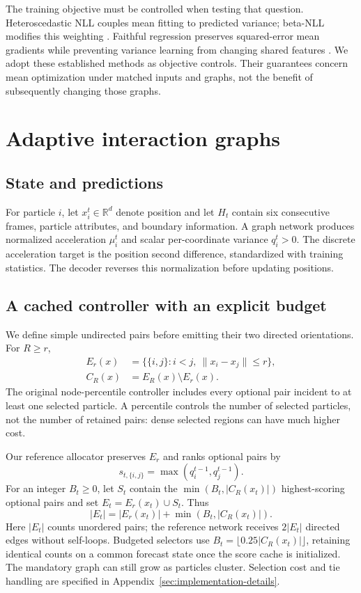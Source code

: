 The training objective must be controlled when testing that question. Heteroscedastic NLL couples mean fitting to predicted variance; beta-NLL modifies this weighting \citep{seitzer2022}. Faithful regression preserves squared-error mean gradients while preventing variance learning from changing shared features \citep{stirn2023}. We adopt these established methods as objective controls. Their guarantees concern mean optimization under matched inputs and graphs, not the benefit of subsequently changing those graphs.

\section{Adaptive interaction graphs}
\subsection{State and predictions}
For particle $i$, let $x_i^t\in\mathbb R^d$ denote position and let $H_t$ contain six consecutive frames, particle attributes, and boundary information. A graph network produces normalized acceleration $\mu_i^t$ and scalar per-coordinate variance $q_i^t>0$. The discrete acceleration target is the position second difference, standardized with training statistics. The decoder reverses this normalization before updating positions.

\subsection{A cached controller with an explicit budget}
We define simple undirected pairs before emitting their two directed orientations. For $R\ge r$,
\begin{align}
 E_r(x)&=\{\{i,j\}:i<j,\ \|x_i-x_j\|\le r\},\nonumber\\
 C_R(x)&=E_R(x)\setminus E_r(x).
\end{align}
The original node-percentile controller includes every optional pair incident to at least one selected particle. A percentile controls the number of selected particles, not the number of retained pairs: dense selected regions can have much higher cost.

Our reference allocator preserves $E_r$ and ranks optional pairs by
\begin{equation}
 s_{t,\{i,j\}}=\max(q_i^{t-1},q_j^{t-1}).
\end{equation}
For an integer $B_t\ge0$, let $S_t$ contain the $\min(B_t,|C_R(x_t)|)$ highest-scoring optional pairs and set $E_t=E_r(x_t)\cup S_t$. Thus
\begin{equation}
 |E_t|=|E_r(x_t)|+\min(B_t,|C_R(x_t)|).
 \label{eq:budget}
\end{equation}
Here $|E_t|$ counts unordered pairs; the reference network receives $2|E_t|$ directed edges without self-loops. Budgeted selectors use $B_t=\lfloor0.25|C_R(x_t)|\rfloor$, retaining identical counts on a common forecast state once the score cache is initialized. The mandatory graph can still grow as particles cluster. Selection cost and tie handling are specified in Appendix~\ref{sec:implementation-details}.

